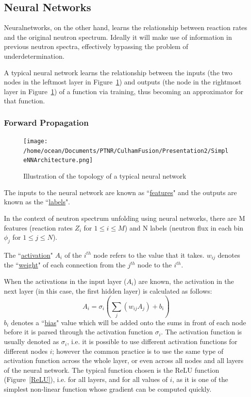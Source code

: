 \documentclass[a4paper, 12pt]{article}
\begin{document}
\subsection{Neural Networks} \label{Neural Network Theory}
Neuralnetworks, on the other hand, learns the relationship between reaction rates and the original neutron spectrum. Ideally it will make use of information in previous neutron spectra, effectively bypassing the problem of underdetermination.

A typical neural network learns the relationship between the inputs (the two nodes in the leftmost layer in Figure~\ref{SimpleNNArchitecture}) and outputs (the node in the rightmost layer in Figure~\ref{SimpleNNArchitecture}) of a function via training, thus becoming an approximator for that function.

\subsubsection{Forward Propagation}
\begin{figure}[H]
    \centering
    \texttt{[image: /home/ocean/Documents/PTNR/CulhamFusion/Presentation2/SimpleNNArchitecture.png]}
    \caption{Illustration of the topology of a typical neural network} \label{SimpleNNArchitecture}
\end{figure}

The inputs to the neural network are known as ``\underline{features}" and the outputs are known as the ``\underline{labels}".

In the context of neutron spectrum unfolding using neural networks, there are M features (reaction rates $Z_i$ for $1\le i\le M$) and N labels (neutron flux in each bin $\phi_j$ for $1 \le j \le N$). 

The ``\underline{activation}" $A_i$ of the $i^{th}$ node refers to the value that it takes.
$w_{ij}$ denotes the ``\underline{weight}" of each connection from the $j^{th}$ node to the $i^{th}$.

When the activations in the input layer ($A_i$) are known, the activation in the next layer (in this case, the first hidden layer) is calculated as follows:
\begin{equation} \label{forwardpropagation}
    A_i = \sigma_i\left({\sum_{j} (w_{ij}A_j) + b_i}\right)
\end{equation}
$b_{i}$ denotes a ``\underline{bias}" value which will be added onto the sums in front of each node before it is parsed through the activation function $\sigma_i$.
The activation function is usually denoted as $\sigma_{i}$, i.e. it is possible to use different activation functions for different nodes $i$; however the common practice is to use the same type of activation function across the whole layer, or even across all nodes and all layers of the neural network. The typical function chosen is the ReLU function (Figure~\ref{ReLU}), i.e. for all layers, and for all values of $i$, as it is one of the simplest non-linear function whose gradient can be computed quickly.
\end{document}
